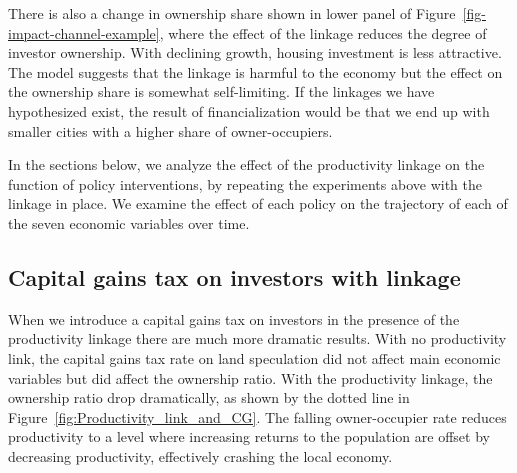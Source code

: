 There is also a change in ownership share shown in lower panel of Figure~\ref{fig-impact-channel-example}, where the effect of the linkage reduces the degree of investor ownership. With declining growth, housing investment is less attractive. The model suggests that the linkage is harmful to the economy but the effect on the ownership share is somewhat self-limiting.  If the linkages we have hypothesized exist, the result of financialization would be that we end up with smaller cities with a higher share of owner-occupiers. %

In the sections below, we analyze the effect of the productivity linkage on the function of policy interventions, by repeating the experiments above with the linkage in place.  %
We examine the effect of each policy 
on the trajectory of each of the seven economic variables over time. 

\newpage
\subsection{Capital gains tax on investors with linkage}\label{subsec:CGinvest}

When we introduce a capital gains tax on investors in the presence of the productivity linkage there are much more dramatic results. 
With no productivity link, the capital gains tax rate on land speculation did not affect main economic variables but did affect the ownership ratio. %
With the productivity linkage, the ownership ratio drop dramatically, as shown by the dotted line in Figure~\ref{fig:Productivity_link_and_CG}. The falling owner-occupier rate reduces productivity to a level where increasing returns to the population are offset by decreasing productivity, effectively crashing the local economy. %

